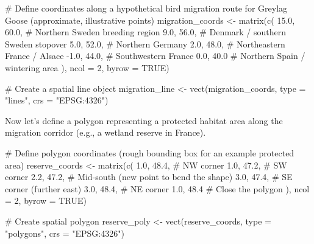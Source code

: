 \documentclass[
]{book}
\newenvironment{Shaded}{\begin{snugshade}}{\end{snugshade}}
\newcommand{\AttributeTok}[1]{\textcolor[rgb]{0.40,0.45,0.13}{#1}}
\newcommand{\CommentTok}[1]{\textcolor[rgb]{0.37,0.37,0.37}{#1}}
\newcommand{\ConstantTok}[1]{\textcolor[rgb]{0.56,0.35,0.01}{#1}}
\newcommand{\DecValTok}[1]{\textcolor[rgb]{0.68,0.00,0.00}{#1}}
\newcommand{\FloatTok}[1]{\textcolor[rgb]{0.68,0.00,0.00}{#1}}
\newcommand{\FunctionTok}[1]{\textcolor[rgb]{0.28,0.35,0.67}{#1}}
\newcommand{\NormalTok}[1]{\textcolor[rgb]{0.00,0.23,0.31}{#1}}
\newcommand{\OtherTok}[1]{\textcolor[rgb]{0.00,0.23,0.31}{#1}}
\newcommand{\SpecialCharTok}[1]{\textcolor[rgb]{0.37,0.37,0.37}{#1}}
\newcommand{\StringTok}[1]{\textcolor[rgb]{0.13,0.47,0.30}{#1}}
\begin{document}
\begin{Shaded}
\begin{Highlighting}[]
\CommentTok{\# Define coordinates along a hypothetical bird migration route for Greylag Goose (approximate, illustrative points)}
\NormalTok{migration\_coords }\OtherTok{\textless{}{-}} \FunctionTok{matrix}\NormalTok{(}\FunctionTok{c}\NormalTok{(}
  \FloatTok{15.0}\NormalTok{, }\FloatTok{60.0}\NormalTok{,   }\CommentTok{\# Northern Sweden breeding region}
   \FloatTok{9.0}\NormalTok{, }\FloatTok{56.0}\NormalTok{,   }\CommentTok{\# Denmark / southern Sweden stopover}
   \FloatTok{5.0}\NormalTok{, }\FloatTok{52.0}\NormalTok{,   }\CommentTok{\# Northern Germany}
   \FloatTok{2.0}\NormalTok{, }\FloatTok{48.0}\NormalTok{,   }\CommentTok{\# Northeastern France / Alsace}
  \SpecialCharTok{{-}}\FloatTok{1.0}\NormalTok{, }\FloatTok{44.0}\NormalTok{,   }\CommentTok{\# Southwestern France}
   \FloatTok{0.0}\NormalTok{, }\FloatTok{40.0}    \CommentTok{\# Northern Spain / wintering area}
\NormalTok{), }\AttributeTok{ncol =} \DecValTok{2}\NormalTok{, }\AttributeTok{byrow =} \ConstantTok{TRUE}\NormalTok{)}

\CommentTok{\# Create a spatial line object}
\NormalTok{migration\_line }\OtherTok{\textless{}{-}} \FunctionTok{vect}\NormalTok{(migration\_coords, }\AttributeTok{type =} \StringTok{"lines"}\NormalTok{, }\AttributeTok{crs =} \StringTok{"EPSG:4326"}\NormalTok{)}
\end{Highlighting}
\end{Shaded}

Now let's define a polygon representing a protected habitat area along
the migration corridor (e.g., a wetland reserve in France).

\begin{Shaded}
\begin{Highlighting}[]
\CommentTok{\# Define polygon coordinates (rough bounding box for an example protected area)}
\NormalTok{reserve\_coords }\OtherTok{\textless{}{-}} \FunctionTok{matrix}\NormalTok{(}\FunctionTok{c}\NormalTok{(}
  \FloatTok{1.0}\NormalTok{, }\FloatTok{48.4}\NormalTok{,   }\CommentTok{\# NW corner}
  \FloatTok{1.0}\NormalTok{, }\FloatTok{47.2}\NormalTok{,   }\CommentTok{\# SW corner}
  \FloatTok{2.2}\NormalTok{, }\FloatTok{47.2}\NormalTok{,   }\CommentTok{\# Mid{-}south (new point to bend the shape)}
  \FloatTok{3.0}\NormalTok{, }\FloatTok{47.4}\NormalTok{,   }\CommentTok{\# SE corner (further east)}
  \FloatTok{3.0}\NormalTok{, }\FloatTok{48.4}\NormalTok{,   }\CommentTok{\# NE corner}
  \FloatTok{1.0}\NormalTok{, }\FloatTok{48.4}    \CommentTok{\# Close the polygon}
\NormalTok{), }\AttributeTok{ncol =} \DecValTok{2}\NormalTok{, }\AttributeTok{byrow =} \ConstantTok{TRUE}\NormalTok{)}

\CommentTok{\# Create spatial polygon}
\NormalTok{reserve\_poly }\OtherTok{\textless{}{-}} \FunctionTok{vect}\NormalTok{(reserve\_coords, }\AttributeTok{type =} \StringTok{"polygons"}\NormalTok{, }\AttributeTok{crs =} \StringTok{"EPSG:4326"}\NormalTok{)}
\end{Highlighting}
\end{Shaded}
\end{document}
